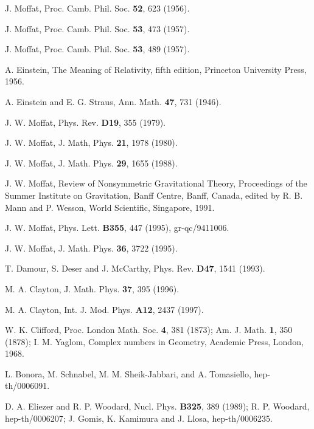 \documentclass[a4paper,10pt]{article}
\begin{document}
\begin{thebibliography}{100}
 J. Moffat, Proc. Camb. Phil. Soc. {\bf 52}, 623 (1956).

 J. Moffat, Proc. Camb. Phil. Soc. {\bf 53}, 473 (1957).

 J. Moffat, Proc. Camb. Phil. Soc. {\bf 53}, 489 (1957).

 A. Einstein, The Meaning of Relativity, fifth edition,
Princeton University Press, 1956.

 A. Einstein and E. G. Straus, Ann. Math. {\bf 47},
731 (1946).

 J. W. Moffat, Phys. Rev. {\bf D19}, 355 (1979).

 J. W. Moffat, J. Math, Phys. {\bf 21}, 1978 (1980).

 J. W. Moffat, J. Math. Phys. {\bf 29}, 1655 (1988).

 J. W. Moffat, Review of Nonsymmetric Gravitational
Theory, Proceedings of the Summer Institute on Gravitation, Banff Centre,
Banff, Canada, edited by R. B. Mann and P. Wesson, World Scientific,
Singapore, 1991.

 J. W. Moffat, Phys. Lett. {\bf B355}, 447 (1995),
gr-qc/9411006.

 J. W. Moffat, J. Math. Phys. {\bf 36}, 3722 (1995).

 T. Damour, S. Deser and J. McCarthy, Phys. Rev. {\bf D47},
1541 (1993).

 M. A. Clayton, J. Math. Phys. {\bf 37}, 395 (1996).

 M. A. Clayton, Int. J. Mod. Phys. {\bf A12}, 2437
(1997).

 W. K. Clifford, Proc. London Math. Soc. {\bf 4}, 381
(1873); Am. J. Math. {\bf 1}, 350 (1878); I. M. Yaglom, Complex numbers in
Geometry, Academic Press, London, 1968.

 L. Bonora, M. Schnabel, M. M. Sheik-Jabbari, and A.
Tomasiello, hep-th/0006091.

 D. A. Eliezer and R. P. Woodard, Nucl. Phys. {\bf B325},
389 (1989); R. P. Woodard, hep-th/0006207; J. Gomis, K. Kamimura and J. 
Llosa, hep-th/0006235.

\end{thebibliography}
\end{document}
